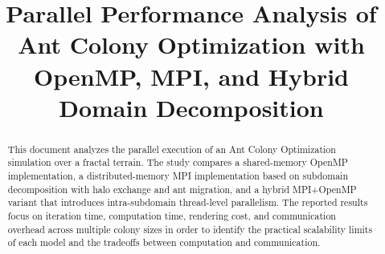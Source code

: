 \documentclass[conference]{IEEEtran}
\begin{document}
\title{Parallel Performance Analysis of Ant Colony Optimization with OpenMP, MPI, and Hybrid Domain Decomposition}

\author{
\and
{}
\and
{}
\and
{}
\and
{}
\and
{}
}

\maketitle

\begin{abstract}
This document analyzes the parallel execution of an Ant Colony Optimization simulation over a fractal terrain. The study compares a shared-memory OpenMP implementation, a distributed-memory MPI implementation based on subdomain decomposition with halo exchange and ant migration, and a hybrid MPI+OpenMP variant that introduces intra-subdomain thread-level parallelism. The reported results focus on iteration time, computation time, rendering cost, and communication overhead across multiple colony sizes in order to identify the practical scalability limits of each model and the tradeoffs between computation and communication.
\end{abstract}
\end{document}
